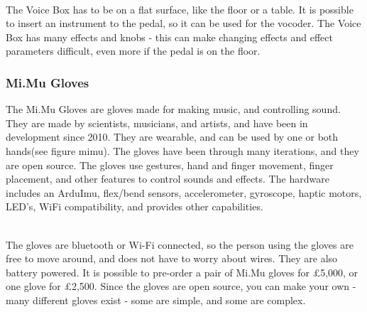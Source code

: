 \begin{minipage}{\linewidth}%
\label{voice_box}
\end{minipage}\\

The Voice Box has to be on a flat surface, like the floor or a table. It is possible to insert an instrument to the pedal, so it can be used for the vocoder. The Voice Box has many effects and knobs - this can make changing effects and effect parameters difficult, even more if the pedal is on the floor.

\subsubsection{Mi.Mu Gloves}

The Mi.Mu Gloves are gloves made for making music, and controlling sound\citep{Mimu}. They are made by scientists, musicians, and artists, and have been in development since 2010. They are wearable, and can be used by one or both hands(see figure mimu). The gloves have been through many iterations, and they are open source. The gloves use gestures, hand and finger movement, finger placement, and other features to control sounds and effects. The hardware includes an ArduImu, flex/bend sensors, accelerometer, gyroscope, haptic motors, LED's, WiFi compatibility, and provides other capabilities.\\

\begin{minipage}{\linewidth}%
\label{mimu}
\end{minipage}\\

The gloves are bluetooth or Wi-Fi connected, so the person using the gloves are free to move around, and does not have to worry about wires. They are also battery powered. It is possible to pre-order a pair of Mi.Mu gloves for £5,000, or one glove for £2,500. 
Since the gloves are open source, you can make your own - many different gloves exist - some are simple, and some are complex.


